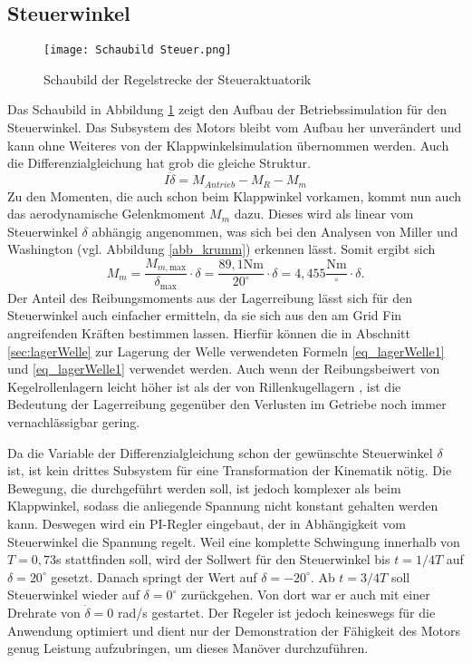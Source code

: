 \subsection{Steuerwinkel}
\begin{figure}[h] 
	\centering
	\texttt{[image: Schaubild Steuer.png]}
	\caption{Schaubild der Regelstrecke der Steueraktuatorik}
	\label{abb_steuerStrecke}
\end{figure}
Das Schaubild in Abbildung \ref{abb_steuerStrecke} zeigt den Aufbau der Betriebssimulation für den Steuerwinkel. Das Subsystem des Motors bleibt vom Aufbau her unverändert und kann ohne Weiteres von der Klappwinkelsimulation übernommen werden. Auch die Differenzialgleichung hat grob die gleiche Struktur.
\begin{equation}
	I\ddot{\delta} = M_{Antrieb} - M_{R} - M_{m}
\end{equation}
Zu den Momenten, die auch schon beim Klappwinkel vorkamen, kommt nun auch das aerodynamische Gelenkmoment $M_m$ dazu. Dieses wird als linear vom Steuerwinkel $\delta$ abhängig angenommen, was sich bei den Analysen von Miller und Washington \cite{synopsis} (vgl. Abbildung \ref{abb_krumm}) erkennen lässt. Somit ergibt sich
\begin{equation}
	M_{m} = \frac{M_{m, \mathrm{max}}}{\delta_\mathrm{max}} \cdot \delta =\frac{89,1\mathrm{Nm}}{20^\circ} \cdot \delta = 4,455\frac{\mathrm{Nm}}{^\circ}\cdot \delta.
\end{equation}
Der Anteil des Reibungsmoments aus der Lagerreibung lässt sich für den Steuerwinkel auch einfacher ermitteln, da sie sich aus den am Grid Fin angreifenden Kräften bestimmen lassen. Hierfür können die in Abschnitt \ref{sec:lagerWelle} zur Lagerung der Welle verwendeten Formeln \ref{eq_lagerWelle1} und \ref{eq_lagerWelle1} verwendet werden. Auch wenn der Reibungsbeiwert von Kegelrollenlagern leicht höher ist als der von Rillenkugellagern \cite{lagerreibung}, ist die Bedeutung der Lagerreibung gegenüber den Verlusten im Getriebe noch immer vernachlässigbar gering.

Da die Variable der Differenzialgleichung schon der gewünschte Steuerwinkel $\delta$ ist, ist kein drittes Subsystem für eine Transformation der Kinematik nötig. Die Bewegung, die durchgeführt werden soll, ist jedoch komplexer als beim Klappwinkel, sodass die anliegende Spannung nicht konstant gehalten werden kann. Deswegen wird ein PI-Regler eingebaut, der in Abhängigkeit vom Steuerwinkel die Spannung regelt.
Weil eine komplette Schwingung innerhalb von $T = 0,73$s stattfinden soll, wird der Sollwert für den Steuerwinkel bis $t = 1/4T$ auf $\delta = 20^\circ$ gesetzt. Danach springt der Wert auf $\delta = -20^\circ$. Ab $t = 3/4T$ soll Steuerwinkel wieder auf $\delta = 0^\circ$ zurückgehen. Von dort war er auch mit einer Drehrate von $\dot{\delta} = 0$ rad/s gestartet.
Der Regeler ist jedoch keineswegs für die Anwendung optimiert und dient nur der Demonstration der Fähigkeit des Motors genug Leistung aufzubringen, um dieses Manöver durchzuführen.

